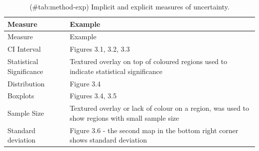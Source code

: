 \documentclass[11pt,]{article}
\begin{document}
\begin{longtable}[]{@{}ll@{}}
\caption{(\#tab:method-exp) Implicit and explicit measures of
uncertainty.}\tabularnewline
\toprule
\begin{minipage}[b]{0.35\columnwidth}\raggedright
Measure\strut
\end{minipage} & \begin{minipage}[b]{0.59\columnwidth}\raggedright
Example\strut
\end{minipage}\tabularnewline
\midrule
\endfirsthead
\toprule
\begin{minipage}[b]{0.35\columnwidth}\raggedright
Measure\strut
\end{minipage} & \begin{minipage}[b]{0.59\columnwidth}\raggedright
Example\strut
\end{minipage}\tabularnewline
\midrule
\endhead
\begin{minipage}[t]{0.35\columnwidth}\raggedright
CI Interval\strut
\end{minipage} & \begin{minipage}[t]{0.59\columnwidth}\raggedright
Figures 3.1, 3.2, 3.3\strut
\end{minipage}\tabularnewline
\begin{minipage}[t]{0.35\columnwidth}\raggedright
Statistical Significance\strut
\end{minipage} & \begin{minipage}[t]{0.59\columnwidth}\raggedright
Textured overlay on top of coloured regions used to indicate statistical
significance\strut
\end{minipage}\tabularnewline
\begin{minipage}[t]{0.35\columnwidth}\raggedright
Distribution\strut
\end{minipage} & \begin{minipage}[t]{0.59\columnwidth}\raggedright
Figure 3.4\strut
\end{minipage}\tabularnewline
\begin{minipage}[t]{0.35\columnwidth}\raggedright
Boxplots\strut
\end{minipage} & \begin{minipage}[t]{0.59\columnwidth}\raggedright
Figures 3.4, 3.5\strut
\end{minipage}\tabularnewline
\begin{minipage}[t]{0.35\columnwidth}\raggedright
Sample Size\strut
\end{minipage} & \begin{minipage}[t]{0.59\columnwidth}\raggedright
Textured overlay or lack of colour on a region, was used to show regions
with small sample size\strut
\end{minipage}\tabularnewline
\begin{minipage}[t]{0.35\columnwidth}\raggedright
Standard deviation\strut
\end{minipage} & \begin{minipage}[t]{0.59\columnwidth}\raggedright
Figure 3.6 - the second map in the bottom right corner shows standard
deviation\strut
\end{minipage}\tabularnewline
\bottomrule
\end{longtable}
\end{document}
